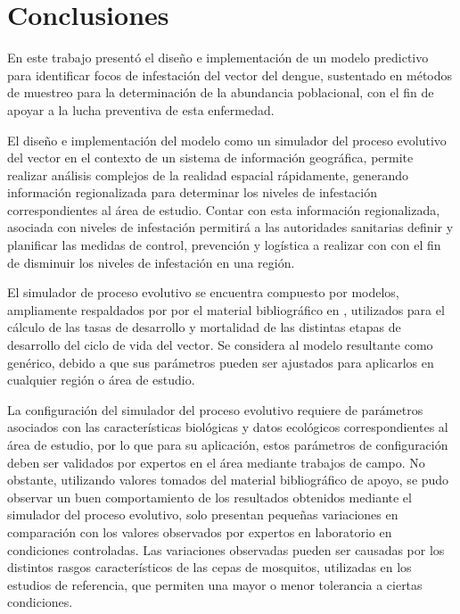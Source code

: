 \chapter{Conclusiones}
En este trabajo presentó el diseño e implementación de un modelo predictivo para identificar focos
de infestación del vector del dengue, sustentado en métodos de muestreo para la determinación de la
abundancia poblacional, con el fin de apoyar a la lucha preventiva de esta enfermedad.

El diseño e implementación del modelo como un simulador del proceso evolutivo del vector en el
contexto de un sistema de información geográfica, permite realizar análisis complejos de la
realidad espacial rápidamente, generando información regionalizada para determinar los niveles de
infestación correspondientes al área de estudio. Contar con esta información regionalizada,
asociada con niveles de infestación permitirá a las autoridades sanitarias definir y planificar
las medidas de control, prevención y logística a realizar con con el fin de disminuir los niveles
de infestación en una región.

El simulador de proceso evolutivo se encuentra compuesto por modelos, ampliamente respaldados por
por el material bibliográfico en
\cite{sharpe1977reaction, focks1993dynamic, schoolfield1981non, otero2006stochastic, rueda1990temperature}, utilizados para el cálculo de las tasas de desarrollo y mortalidad de las
distintas etapas de desarrollo del ciclo de vida del vector. Se considera al modelo resultante
como genérico, debido a que sus parámetros pueden ser ajustados para aplicarlos en cualquier
región o área de estudio.

La configuración del simulador del proceso evolutivo requiere de parámetros asociados con las
características biológicas y datos ecológicos correspondientes al área de estudio, por lo que para
su aplicación, estos parámetros de configuración deben ser validados por expertos en el área
mediante trabajos de campo. No obstante, utilizando valores tomados del material bibliográfico de
apoyo, se pudo observar un buen comportamiento de los resultados obtenidos mediante el simulador
del proceso evolutivo, solo presentan pequeñas variaciones en comparación con los valores
observados por expertos en laboratorio en condiciones controladas. Las variaciones observadas
pueden ser causadas por los distintos rasgos característicos de las cepas de mosquitos, utilizadas
en los estudios de referencia, que permiten una mayor o menor tolerancia a ciertas condiciones.


